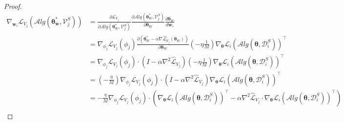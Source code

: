 \begin{proof}
\begin{equation}
    \begin{aligned}
    \nabla_{\mathbf{w}_i} \mathcal{L}_{V_j}(\mathcal{A}lg(\boldsymbol{\theta}^{*}_{\mathbf{w}}, \mathcal{V}_j^{S})) &= \frac{\partial \mathcal{L}_{V_j}}{\partial \mathcal{A}lg(\boldsymbol{\theta}_{W}^{*}, \mathcal{V}_j^{S})}\frac{\partial \mathcal{A}lg(\boldsymbol{\theta}^{*}_{W}, \mathcal{V}_j^{S})}{\partial \boldsymbol{\theta}_{W}} \frac{d \boldsymbol{\theta}_{W}}{d \mathbf{w}_i} \hspace{4cm} \\
    &= \nabla_{\phi_j} \mathcal{L}_{V_j}(\phi_j)  \frac{\partial (\boldsymbol{\theta}^{*}_{W} - \alpha \nabla \widehat{\mathcal{L}}_{V_j}(\boldsymbol{\theta}_{W}))}{\partial \boldsymbol{\theta}_{W}} (-\eta \frac{1}{M}) \nabla_{\boldsymbol{\theta}}\mathcal{L}_i(\mathcal{A}lg(\boldsymbol{\theta}, \mathcal{D}_i^{S}))^{\intercal} \\
    &= \nabla_{\phi_j} \mathcal{L}_{V_j}(\phi_j) \cdot \left(I - \alpha \nabla^2\widehat{\mathcal{L}}_{V_j}\right) (-\eta \frac{1}{M}) \nabla_{\boldsymbol{\theta}}\mathcal{L}_i(\mathcal{A}lg(\boldsymbol{\theta}, \mathcal{D}_i^{S}))^{\intercal} \\
    &= (- \frac{\eta}{M})\nabla_{\phi_j} \mathcal{L}_{V_j}(\phi_j) \cdot \left(I - \alpha \nabla^2\widehat{\mathcal{L}}_{V_j}\right)  \nabla_{\boldsymbol{\theta}}\mathcal{L}_i(\mathcal{A}lg(\boldsymbol{\theta}, \mathcal{D}_i^{S}))^{\intercal} \\
    &= -\frac{\eta}{M} \nabla_{\phi_j} \mathcal{L}_{V_j}(\phi_j) \cdot \left( \nabla_{\boldsymbol{\theta}}\mathcal{L}_i(\mathcal{A}lg(\boldsymbol{\theta}, \mathcal{D}_i^{S}))^{\intercal} - \alpha  \nabla^2\widehat{\mathcal{L}}_{V_j}\cdot \nabla_{\boldsymbol{\theta}}\mathcal{L}_i(\mathcal{A}lg(\boldsymbol{\theta}, \mathcal{D}_i^{S}))^{\intercal} \right) \\
    \end{aligned}
\end{equation}


\end{proof}
